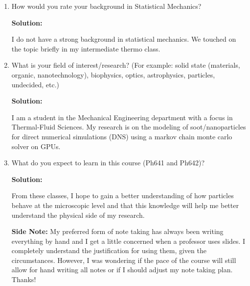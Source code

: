 \documentclass[10pt]{article}
\newenvironment{Solution}
    {\textbf{Solution:}
    
    \vspace{5mm}
    \begin{tcolorbox}
    }
    {
    \end{tcolorbox}
    \vspace{5mm}
    }
\begin{document}
\begin{enumerate}
\begin{Solution}
\end{Solution}

\item How would you rate your background in Statistical Mechanics? 

\begin{Solution}
I do not have a strong background in statistical mechanics. We touched on the topic briefly in my intermediate thermo class.

\end{Solution}
\newpage 

\item What is your field of interest/research? (For example: solid state (materials, organic, nanotechnology), biophysics, optics, astrophysics, particles, undecided, etc.)

\begin{Solution}
I am a student in the Mechanical Engineering department with a focus in Thermal-Fluid Sciences. My research is on the modeling of soot/nanoparticles for direct numerical simulations (DNS) using a markov chain monte carlo solver on GPUs. 

\end{Solution}

\item What do you expect to learn in this course (Ph641 and Ph642)?

\begin{Solution}
From these classes, I hope to gain a better understanding of how particles behave at the microscopic level and that this knowledge will help me better understand the physical side of my research.
\vspace{5mm}

\textbf{Side Note:} My preferred form of note taking has always been writing everything by hand and I get a little concerned when a professor uses slides. I completely understand the justification for using them, given the circumstances. However, I was wondering if the pace of the course will still allow for hand writing all notes or if I should adjust my note taking plan. Thanks! 

\end{Solution}
\end{enumerate}
\end{document}

